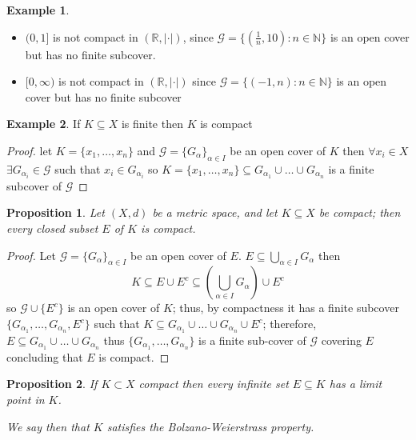 \documentclass[11pt,openany]{book}
\theoremstyle{plain}
\newtheorem{proposition}{Proposition}[chapter]
\theoremstyle{definition}
\newtheorem{example}{Example}[chapter]
\theoremstyle{remark}
\newcommand{\R}{\mathbb{R}}
\newcommand{\N}{\mathbb{N}}
\begin{document}
\begin{example}
    \begin{itemize}
        \item $(0,1]$ is not compact in $(\R, |\cdot|)$, since $\mathcal{G} = \{(\frac{1}{n}, 10) : n \in \mathbb{N}\}$ is an open cover but has no finite subcover.
        \item $[0, \infty)$ is not compact in $(\R, |\cdot|)$ since $\mathcal{G} = \{(-1,n) : n \in \N\}$ is an open cover but has no finite subcover
    \end{itemize}
\end{example}
\begin{example}
    If $K\subseteq X$ is finite then $K$ is compact
    \begin{proof}
        let $K = \{x_1, \dots, x_n \}$ and $\mathcal{G} = \{G_{\alpha}\}_{\alpha \in I}$ be an open cover of $K$ then $\forall x_i \in X$ $\exists G_{\alpha_i} \in \mathcal{G}$ such that $x_i \in G_{\alpha_i}$ so $K = \{x_1, \dots , x_n\} \subseteq G_{\alpha_1}\cup \dots \cup G_{\alpha_n}$ is a finite subcover of $\mathcal{G}$
    \end{proof}
\end{example}

\begin{proposition}
    Let $(X,d)$ be a metric space, and let $K \subseteq X$ be compact; then every closed subset $E$ of $K$ is compact.
\end{proposition}





\begin{proof}
    Let $\mathcal{G} = \{G_{\alpha}\}_{\alpha \in I}$ be an open cover of $E$. $E \subseteq \bigcup\limits_{\alpha \in I} G_{\alpha}$ then
    $$ K \subseteq E \cup E^c \subseteq \left(\bigcup_{\alpha\in I} G_{\alpha}\right) \cup E^c$$ so $\mathcal{G} \cup \{E^c\}$ is an open cover of $K$; thus, by compactness it has a finite subcover $\{G_{\alpha_1}, \dots , G_{\alpha_n}, E^c\}$ such that $K \subseteq G_{\alpha_1} \cup \dots \cup G_{\alpha_n} \cup E^c$; therefore, $E \subseteq G_{\alpha_1} \cup \dots \cup G_{\alpha_n}$ thus $\{G_{\alpha_1}, \dots , G_{\alpha_n}\}$ is a finite sub-cover of $\mathcal{G}$ covering $E$ concluding that $E$ is compact. 
\end{proof}

\begin{proposition}\label{prop:CompactBolzano}
If $K\subset X$ compact then every infinite set $E\subseteq K$ has a limit point in $K$.

We say then that $K$ satisfies the Bolzano-Weierstrass property.
\end{proposition}
\end{document}

